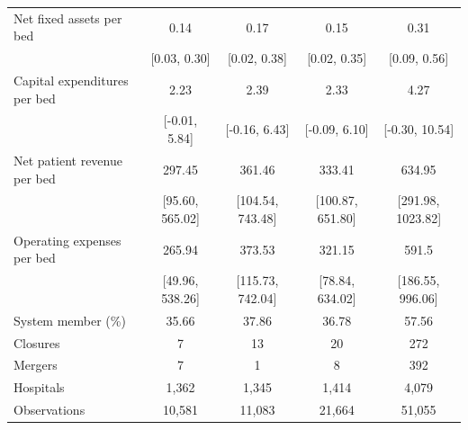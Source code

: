 \begin{tabular}[t]{lcccc}
Net fixed assets per bed & 0.14 & 0.17 & 0.15 & 0.31 \\
 & {}[0.03, 0.30] & {}[0.02, 0.38] & {}[0.02, 0.35] & {}[0.09, 0.56] \\
Capital expenditures per bed & 2.23 & 2.39 & 2.33 & 4.27 \\
 & {}[-0.01, 5.84] & {}[-0.16, 6.43] & {}[-0.09, 6.10] & {}[-0.30, 10.54] \\
Net patient revenue per bed & 297.45 & 361.46 & 333.41 & 634.95 \\
 & {}[95.60, 565.02] & {}[104.54, 743.48] & {}[100.87, 651.80] & {}[291.98, 1023.82] \\
Operating expenses per bed & 265.94 & 373.53 & 321.15 & 591.5 \\
 & {}[49.96, 538.26] & {}[115.73, 742.04] & {}[78.84, 634.02] & {}[186.55, 996.06] \\
System member (\%) & 35.66 & 37.86 & 36.78 & 57.56 \\
Closures & 7 & 13 & 20 & 272 \\
Mergers & 7 & 1 & 8 & 392 \\
\addlinespace
Hospitals & 1,362 & 1,345 & 1,414 & 4,079 \\
Observations & 10,581 & 11,083 & 21,664 & 51,055 \\
\bottomrule
\end{tabular}
